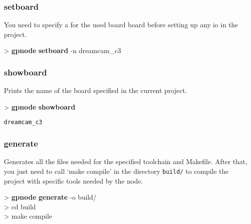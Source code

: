 \documentclass[10pt,a4paper]{article}
\begin{document}
\subsubsection{setboard}

You need to specify a for the used board board before setting up any io in the project.


\begin{sampletitle}
> \textbf{gpnode} \textbf{setboard} -n dreamcam\_c3
\end{sampletitle}


\subsubsection{showboard}

Prints the name of the board specified in the current project.

\begin{sampletitle}
> \textbf{gpnode} \textbf{showboard}
\begin{Verbatim}
dreamcam_c3
\end{Verbatim}
\end{sampletitle}


\subsubsection{generate}

Generates all the files needed for the specified toolchain and Makefile. After that, you just need to call `make compile' in the directory \texttt{build/} to compile the project with specific tools needed by the node.


\begin{sampletitle}
> \textbf{gpnode} \textbf{generate} -o build/\\
> cd build\\
> make compile
\end{sampletitle}
\end{document}
